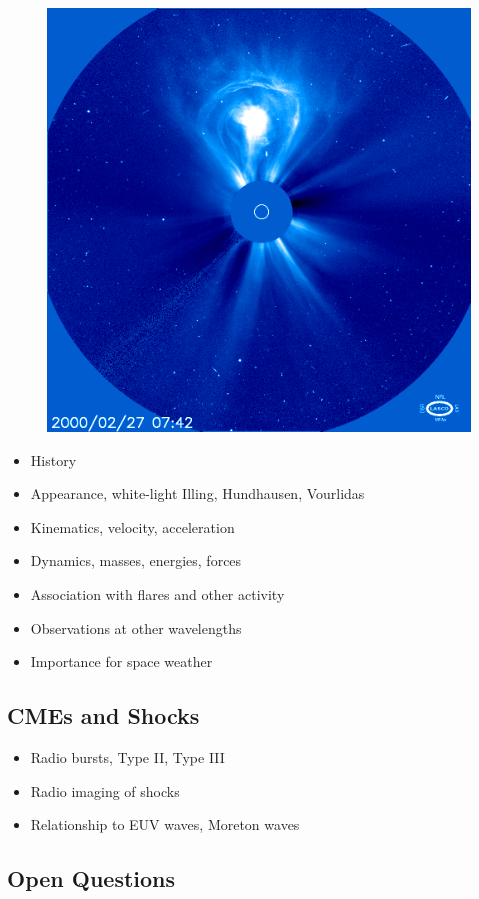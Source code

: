 \begin{figure}
\begin{center}
\includegraphics[scale=0.5]{images/lasco_c3}
\end{center}
\end{figure}

\begin{itemize}
\item History
\item Appearance, white-light Illing, Hundhausen, Vourlidas
\item Kinematics, velocity, acceleration
\item Dynamics, masses, energies, forces
\item Association with flares and other activity
\item Observations at other wavelengths
\item Importance for space weather
\end{itemize}

\subsection{CMEs and Shocks}\label{sec:21}

\begin{itemize}
\item Radio bursts, Type II, Type III
\item Radio imaging of shocks
\item Relationship to EUV waves, Moreton waves
\end{itemize}

\subsection{Open Questions}\label{sec:22}






